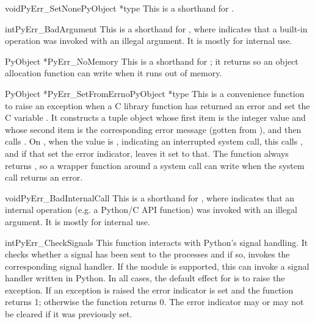 \documentclass[twoside]{report}
\begin{document}
\begin{cfuncdesc}{void}{PyErr_SetNone}{PyObject *type}
This is a shorthand for .
\end{cfuncdesc}

\begin{cfuncdesc}{int}{PyErr_BadArgument}{}
This is a shorthand for , where  indicates that a built-in operation
was invoked with an illegal argument.  It is mostly for internal use.
\end{cfuncdesc}

\begin{cfuncdesc}{PyObject *}{PyErr_NoMemory}{}
This is a shorthand for ; it
returns \NULL{} so an object allocation function can write
 when  it runs out of memory.
\end{cfuncdesc}

\begin{cfuncdesc}{PyObject *}{PyErr_SetFromErrno}{PyObject *type}
This is a convenience function to raise an exception when a C library
function has returned an error and set the C variable .
It constructs a tuple object whose first item is the integer
 value and whose second item is the corresponding error
message (gotten from ), and then calls
.  On \UNIX{}, when
the  value is , indicating an interrupted
system call, this calls , and if that set
the error indicator, leaves it set to that.  The function always
returns \NULL{}, so a wrapper function around a system call can write 
 when  the system call returns an error.
\end{cfuncdesc}

\begin{cfuncdesc}{void}{PyErr_BadInternalCall}{}
This is a shorthand for , where  indicates that an internal
operation (e.g. a Python/C API function) was invoked with an illegal
argument.  It is mostly for internal use.
\end{cfuncdesc}

\begin{cfuncdesc}{int}{PyErr_CheckSignals}{}
This function interacts with Python's signal handling.  It checks
whether a signal has been sent to the processes and if so, invokes the
corresponding signal handler.  If the  module is
supported, this can invoke a signal handler written in Python.  In all
cases, the default effect for  is to raise the
 exception.  If an exception is raised the
error indicator is set and the function returns 1; otherwise the
function returns 0.  The error indicator may or may not be cleared if
it was previously set.
\end{cfuncdesc}
\end{document}
